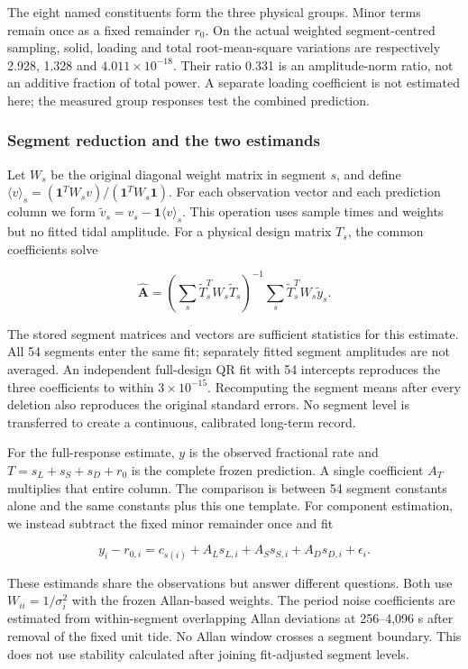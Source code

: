 \documentclass[
  12pt,
  a4paper,
]{article}
\begin{document}
The eight named constituents form the three physical groups. Minor terms
remain once as a fixed remainder \(r_0\). On the actual weighted
segment-centred sampling, solid, loading and total root-mean-square
variations are respectively 2.928, 1.328 and \(4.011\times10^{-18}\).
Their ratio 0.331 is an amplitude-norm ratio, not an additive fraction
of total power. A separate loading coefficient is not estimated here;
the measured group responses test the combined prediction.

\hypertarget{segment-reduction-and-the-two-estimands}{%
\subsubsection{Segment reduction and the two
estimands}\label{segment-reduction-and-the-two-estimands}}

Let \(W_s\) be the original diagonal weight matrix in segment \(s\), and
define
\(\langle v\rangle_s=(\mathbf{1}^TW_sv)/(\mathbf{1}^TW_s\mathbf{1})\).
For each observation vector and each prediction column we form
\(\widetilde v_s=v_s-\mathbf{1}\langle v\rangle_s\). This operation uses
sample times and weights but no fitted tidal amplitude. For a physical
design matrix \(T_s\), the common coefficients solve

\[\widehat{\boldsymbol A}=\left(\sum_s\widetilde T_s^TW_s\widetilde T_s\right)^{-1}\sum_s\widetilde T_s^TW_s\widetilde y_s.\]

The stored segment matrices and vectors are sufficient statistics for
this estimate. All 54 segments enter the same fit; separately fitted
segment amplitudes are not averaged. An independent full-design QR fit
with 54 intercepts reproduces the three coefficients to within
\(3\times10^{-15}\). Recomputing the segment means after every deletion
also reproduces the original standard errors. No segment level is
transferred to create a continuous, calibrated long-term record.

For the full-response estimate, \(y\) is the observed fractional rate
and \(T=s_L+s_S+s_D+r_0\) is the complete frozen prediction. A single
coefficient \(A_T\) multiplies that entire column. The comparison is
between 54 segment constants alone and the same constants plus this one
template. For component estimation, we instead subtract the fixed minor
remainder once and fit

\[y_i-r_{0,i}=c_{s(i)}+A_Ls_{L,i}+A_Ss_{S,i}+A_Ds_{D,i}+\epsilon_i.\]

These estimands share the observations but answer different questions.
Both use \(W_{ii}=1/\sigma_i^2\) with the frozen Allan-based weights.
The period noise coefficients are estimated from within-segment
overlapping Allan deviations at 256--4,096 s after removal of the fixed
unit tide. No Allan window crosses a segment boundary. This does not use
stability calculated after joining fit-adjusted segment levels.
\end{document}
